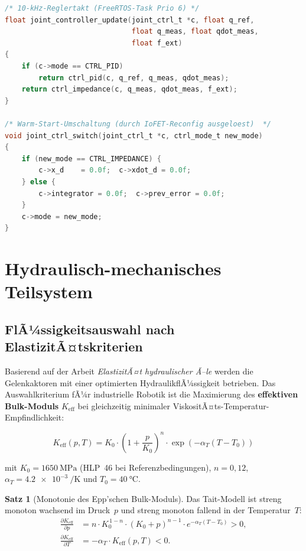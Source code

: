 ﻿\documentclass[a4paper,12pt]{scrreprt}
\theoremstyle{definition}
\newtheorem{satz}{Satz}[section]
\begin{document}
\begin{lstlisting}[language=C,
  caption={joint\_controller.c -- PID/Impedanz-Gelenkeregler
    mit hydraulischem Epp-Feedforward auf STM32H7 Cortex-M7 (10 kHz).},
  label={lst:joint_ctrl}]
/* 10-kHz-Reglertakt (FreeRTOS-Task Prio 6) */
float joint_controller_update(joint_ctrl_t *c, float q_ref,
                              float q_meas, float qdot_meas,
                              float f_ext)
{
    if (c->mode == CTRL_PID)
        return ctrl_pid(c, q_ref, q_meas, qdot_meas);
    return ctrl_impedance(c, q_meas, qdot_meas, f_ext);
}

/* Warm-Start-Umschaltung (durch IoFET-Reconfig ausgeloest)  */
void joint_ctrl_switch(joint_ctrl_t *c, ctrl_mode_t new_mode)
{
    if (new_mode == CTRL_IMPEDANCE) {
        c->x_d    = 0.0f;  c->xdot_d = 0.0f;
    } else {
        c->integrator = 0.0f;  c->prev_error = 0.0f;
    }
    c->mode = new_mode;
}
\end{lstlisting}

\section{Hydraulisch-mechanisches Teilsystem}

\subsection{FlÃ¼ssigkeitsauswahl nach ElastizitÃ¤tskriterien}

Basierend auf der Arbeit \emph{ElastizitÃ¤t hydraulischer Ã–le} werden
die Gelenkaktoren mit einer optimierten HydraulikflÃ¼ssigkeit betrieben.
Das Auswahlkriterium fÃ¼r industrielle Robotik ist die Maximierung des
\textbf{effektiven Bulk-Moduls} $K_{\text{eff}}$ bei gleichzeitig
minimaler ViskositÃ¤ts-Temperatur-Empfindlichkeit:

\begin{equation}
  K_{\text{eff}}(p, T) = K_0 \cdot
  \left(1 + \frac{p}{K_0}\right)^n \cdot
  \exp\!\left(-\alpha_T (T - T_0)\right)
\end{equation}

mit $K_0 = \SI{1650}{\mega\pascal}$ (HLP~46 bei Referenzbedingungen),
$n = 0{,}12$, $\alpha_T = \SI{4.2e-3}{\per\kelvin}$ und
$T_0 = \SI{40}{\celsius}$.

\begin{satz}[Monotonie des Epp'schen Bulk-Moduls]
\label{satz:bulkmonoton}
Das Tait-Modell ist streng monoton wachsend im Druck~$p$ und streng
monoton fallend in der Temperatur~$T$:
\begin{align}
  \frac{\partial K_{\text{eff}}}{\partial p}
  &= n \cdot K_0^{\,1-n} \cdot (K_0 + p)^{n-1}
     \cdot e^{-\alpha_T(T-T_0)} > 0, \label{eq:dKdp}\\
  \frac{\partial K_{\text{eff}}}{\partial T}
  &= -\alpha_T \cdot K_{\text{eff}}(p,T) < 0. \label{eq:dKdT}
\end{align}
\end{satz}
\end{document}
